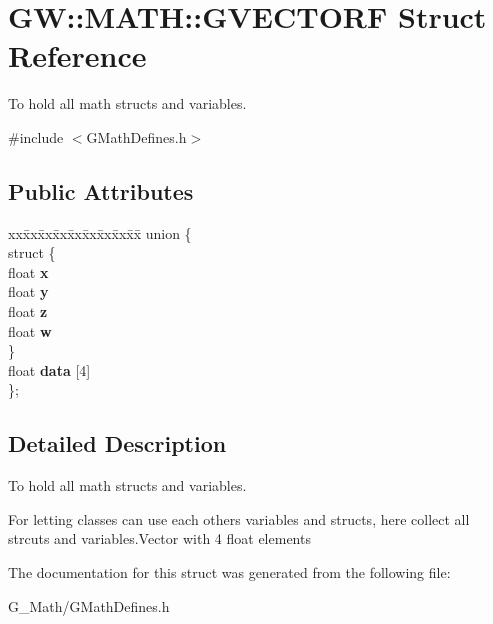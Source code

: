 \hypertarget{struct_g_w_1_1_m_a_t_h_1_1_g_v_e_c_t_o_r_f}{}\section{GW\+:\+:M\+A\+TH\+:\+:G\+V\+E\+C\+T\+O\+RF Struct Reference}
\label{struct_g_w_1_1_m_a_t_h_1_1_g_v_e_c_t_o_r_f}


To hold all math structs and variables.  




{\ttfamily \#include $<$G\+Math\+Defines.\+h$>$}

\subsection*{Public Attributes}
\begin{DoxyCompactItemize}
\item 
\mbox{\label{struct_g_w_1_1_m_a_t_h_1_1_g_v_e_c_t_o_r_f_a38acd9d2b655a4357b2430d20e50f31e}} 
\begin{tabbing}
xx\=xx\=xx\=xx\=xx\=xx\=xx\=xx\=xx\=\kill
union \{\\
\mbox{\label{union_g_w_1_1_m_a_t_h_1_1_g_v_e_c_t_o_r_f_1_1_0D4_a8671179b6484d5fa64dc13ba474fa3a8}} 
\>struct \{\\
\>\>float {\bfseries x}\\
\>\>float {\bfseries y}\\
\>\>float {\bfseries z}\\
\>\>float {\bfseries w}\\
\>\} \\
\>float {\bfseries data} \mbox{[}4\mbox{]}\\
\}; \\

\end{tabbing}\end{DoxyCompactItemize}


\subsection{Detailed Description}
To hold all math structs and variables. 

For letting classes can use each others variables and structs, here collect all strcuts and variables.\+Vector with 4 float elements 

The documentation for this struct was generated from the following file\+:\begin{DoxyCompactItemize}
\item 
G\+\_\+\+Math/G\+Math\+Defines.\+h\end{DoxyCompactItemize}
